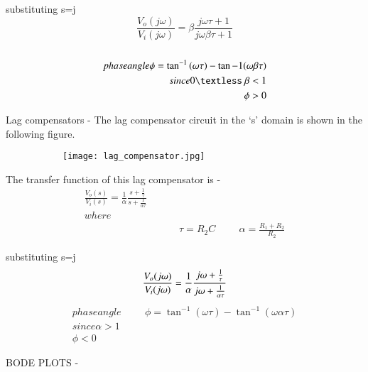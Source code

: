 \begin{enumerate}[label=\thesection.\arabic*.,ref=\thesection.\theenumi]
\vspace{0.3cm}substituting s=j\omega \\
\begin{equation}
 \frac{V_o(j\omega)}{V_i(j\omega)} = \beta  \frac{j\omega \tau +1}{j \omega\beta \tau +1}
\end{equation}
\\
\begin{align}
phase angle \phi = \tan^{-1} {(\omega\tau)} - \tan{-1}{(\omega\beta\tau)}\\
since 0 \textless \ \beta < 1\\
\phi > 0
\end{align}




Lag compensators - 
The lag compensator circuit in the ‘s’ domain is shown in the following figure.
 
\begin{figure}[h]
 
\begin{subfigure}{0.5\textwidth}
\texttt{[image: lag\_compensator.jpg]} 
\label{fig:subim1}
\end{subfigure}
\end{figure}

The transfer function of this lag compensator is -
\begin{align}
    \frac{V_o(s)}{V_i(s)} = \frac{1}{\alpha}  \frac{s + \frac{1}{\tau}}{s + \frac{1}{\alpha\tau}} \\
where\\
\hspace{4cm} \tau = R_2C \hspace{1cm} \alpha =\frac{R_1+R_2}{R_2}
\end{align}

\vspace{0.3cm}substituting s=j\omega \\
\begin{equation}
\centering
 \frac{V_o(j\omega)}{V_i(j\omega)} = \frac{1}{\alpha}  \frac{j\omega + \frac{1}{\tau}}{j\omega + \frac{1}{\alpha\tau}}
\end{equation}
\begin{align}
phase angle \hspace{1cm}\phi = \tan^{-1} {(\omega\tau)} - \tan^{-1}{(\omega\alpha\tau)}\\
since \alpha > 1\\
\phi < 0
\end{align}


BODE PLOTS -
\begin{figure}[h]
 

\end{figure}
\end{enumerate}

